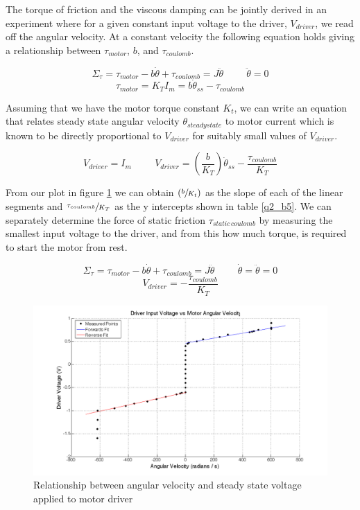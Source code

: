 \documentclass{article}
\theoremstyle{plain}
\theoremstyle{definition}
\theoremstyle{remark}
\begin{document}
The torque of friction and the viscous damping can be jointly  derived in an experiment where for a given constant input voltage to the driver, $V_{driver}$, we read off the angular velocity.  At a constant velocity the following equation holds giving a relationship between $\tau_{motor}$, $b$, and $\tau_{coulomb}$.

$$\Sigma_{\tau} =  \tau_{motor} - b\dot{\theta} + \tau_{coulomb} = J \ddot{\theta} \hspace{1cm} \ddot{\theta} = 0 $$
$$ \tau_{motor} = K_{T}I_{m} = b\dot{\theta}_{ss} - \tau_{coulomb}$$

Assuming that we have the motor torque constant $K_{t}$, we can write an equation that relates steady state angular velocity $\theta_{steady state}$ to motor current which is known to be directly proportional to $V_{driver}$ for suitably small values of $V_{driver}$.

$$ V_{driver} = I_{m} \hspace{1cm} V_{driver} = \left( \frac{b}{K_T} \right) \dot{\theta}_{ss} - \frac{\tau_{coulomb}}{K_{T}} $$

From our plot in figure \ref{q2_b4} we can obtain $\left( \sfrac{b}{K_t} \right)$ as the slope of each of the linear segments and $\sfrac{\tau_{coulomb}}{K_{T}}$ as the y intercepts shown in table \ref{q2_b5}.  We can separately determine the force of static friction $\tau_{static \, coulomb}$ by measuring the smallest input voltage to the driver, and from this how much torque, is required to start the motor from rest.

$$ \Sigma_{\tau} =  \tau_{motor} - b\dot{\theta} + \tau_{coulomb} = J \ddot{\theta} \hspace{1cm} \dot{\theta} = \ddot{\theta} = 0 $$
$$ V_{driver} = - \frac{\tau_{coulomb}}{K_{T}} $$

\begin{figure}[htb]
\begin{center}
\includegraphics[width = 16cm]{SpeedCurrentCurve.png}
\caption{Relationship between angular velocity and steady state voltage applied to motor driver}
\label{q2_b4}
\end{center}
\end{figure}
\end{document}
